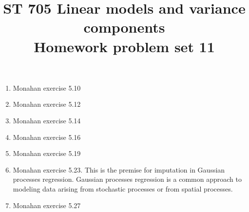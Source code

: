 \documentclass[11pt]{article}
\title{ST 705 Linear models and variance components \\ 
        Homework problem set 11}
\begin{document}
\maketitle

\begin{enumerate}

\item Monahan exercise 5.10

\item Monahan exercise 5.12

\item Monahan exercise 5.14

\item Monahan exercise 5.16

\item Monahan exercise 5.19

\item Monahan exercise 5.23.  This is the premise for imputation in Gaussian processes regression.  Gaussian processes regression is a common approach to modeling data arising from stochastic processes or from spatial processes. 

\item Monahan exercise 5.27

\end{enumerate}
\end{document}
